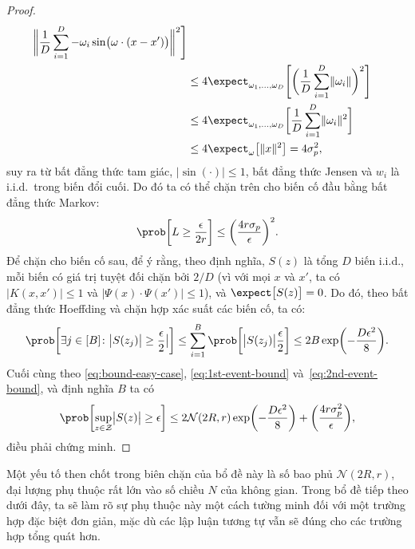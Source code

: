 \begin{proof}
\begin{align}
    \biggl\lVert \frac{1}{D} \sum_{i = 1}^D -\omega_i \sin\bigl( \omega \cdot
    (x - x') \bigr ) \biggr\rVert^2 \Biggr ] \\
    &\le 4 \expect_{\omega_1,\dots,\omega_D} \Biggl[ \biggl( \frac{1}{D}
    \sum_{i = 1}^D \lVert \omega_i \rVert \biggr )^2 \Biggr ] \\
    &\le 4 \expect_{\omega_1,\dots,\omega_D} \biggl[ \frac{1}{D} \sum_{i = 1}^D
    \lVert \omega_i \rVert^2 \biggr ] \\
    &\le 4 \expect_{\omega}\bigl[ \lVert x \rVert^2 \bigr ] = 4\sigma_p^2,
  \end{align}suy ra từ bất đẳng thức tam giác, $\bigl\lvert \sin(\cdot)
  \bigr\rvert \le 1$, bất đẳng thức Jensen và $w_i$ là i.i.d.\ trong biến đổi
  cuối. Do đó ta có thể chặn trên cho biến cố đầu bằng bất đẳng thức Markov:
  \begin{equation}\label{eq:1st-event-bound}
    \prob\biggl[ L \ge \frac{\epsilon}{2r} \biggr ] \le \biggl(
    \frac{4r\sigma_p}{\epsilon} \biggr )^2.
  \end{equation} Để chặn cho biến cố sau, để ý rằng, theo định nghĩa, $S(z)$ là
  tổng $D$ biến i.i.d., mỗi biến có giá trị tuyệt đối chặn bởi $2/D$ (vì với
  mọi $x$ và $x'$, ta có $\bigl\lvert K(x, x') \bigr\rvert \le 1$ và
  $\bigl\lvert \Psi(x) \cdot \Psi(x') \bigr\rvert \le 1$), và $\expect\bigl[
    S(z) \bigr ] = 0$. Do đó, theo bất đẳng thức Hoeffding và chặn hợp xác suất
  các biến cố, ta có: \begin{equation}\label{eq:2nd-event-bound}
    \prob\biggl[ \exists j \in [B] \colon \bigl\lvert S(z_j) \bigr\rvert \ge
    \frac{\epsilon}{2} \bigr\rvert \biggr ] \le \sum_{i=1}^B \prob\biggl[
      \bigl\lvert S(z_j) \bigr\rvert \frac{\epsilon}{2} \biggr] \le
    2B\exp\biggl( - \frac{D\epsilon^2}{8} \biggr ).
  \end{equation} Cuối cùng theo \eqref{eq:bound-easy-case},
  \eqref{eq:1st-event-bound} và~\eqref{eq:2nd-event-bound}, và định nghĩa $B$
  ta có \begin{equation}
    \prob\biggl[ \sup_{z\in \mathcal{Z}} \bigl\lvert S(z) \bigr\lvert \ge
    \epsilon \biggr ] \le 2\mathcal{N}(2R, r) \exp\biggl(-
    \frac{D\epsilon^2}{8} \biggr) + \biggl( \frac{4r\sigma_p^2}{\epsilon}
    \biggr ),
  \end{equation} điều phải chứng minh.
\end{proof}

Một yếu tố then chốt trong biên chặn của bổ đề này là số bao phủ
$\mathcal{N}(2R, r)$, đại lượng phụ thuộc rất lớn vào số chiều $N$ của không
gian. Trong bổ đề tiếp theo dưới đây, ta sẽ làm rõ sự phụ thuộc này một
cách tường minh đối với một trường hợp đặc biệt đơn giản, mặc dù các lập luận
tương tự vẫn sẽ đúng cho các trường hợp tổng quát hơn.


